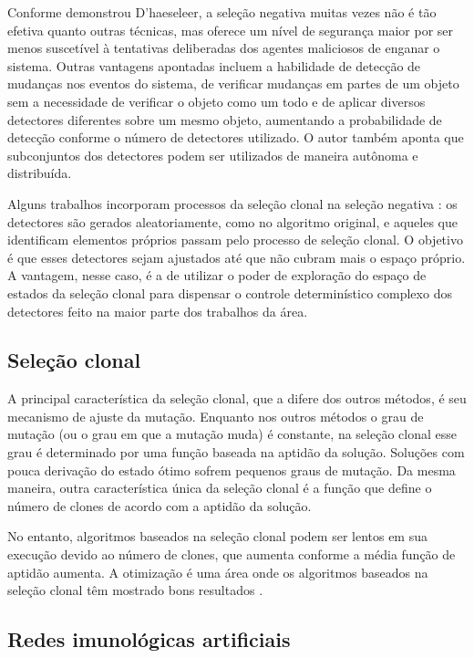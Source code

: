 Conforme demonstrou D’haeseleer, a seleção negativa muitas vezes não é tão efetiva quanto outras técnicas, mas oferece um nível de segurança maior por ser menos suscetível à tentativas deliberadas dos agentes maliciosos de enganar o sistema. Outras vantagens apontadas incluem a habilidade de detecção de mudanças nos eventos do sistema, de verificar mudanças em partes de um objeto sem a necessidade de verificar o objeto como um todo e de aplicar diversos detectores diferentes sobre um mesmo objeto, aumentando a probabilidade de detecção conforme o número de detectores utilizado. O autor também aponta que subconjuntos dos detectores podem ser utilizados de maneira autônoma e distribuída.

Alguns trabalhos incorporam processos da seleção clonal na seleção negativa \cite{Garrett2005}: os detectores são gerados aleatoriamente, como no algoritmo original, e aqueles que identificam elementos próprios passam pelo processo de seleção clonal. O objetivo é que esses detectores sejam ajustados até que não cubram mais o espaço próprio. A vantagem, nesse caso, é a de utilizar o poder de exploração do espaço de estados da seleção clonal para dispensar o controle determinístico complexo dos detectores feito na maior parte dos trabalhos da área.

\subsection{Seleção clonal}

A principal característica da seleção clonal, que a difere dos outros métodos, é seu mecanismo de ajuste da mutação. Enquanto nos outros métodos o grau de mutação (ou o grau em que a mutação muda) é constante, na seleção clonal esse grau é determinado por uma função baseada na aptidão da solução. Soluções com pouca derivação do estado ótimo sofrem pequenos graus de mutação. Da mesma maneira, outra característica única da seleção clonal é a função que define o número de clones de acordo com a aptidão da solução.

No entanto, algoritmos baseados na seleção clonal podem ser lentos em sua execução devido ao número de clones, que aumenta conforme a média função de aptidão aumenta. A otimização é uma área onde os algoritmos baseados na seleção clonal têm mostrado bons resultados \cite{Garrett2005}.

\subsection{Redes imunológicas artificiais}

